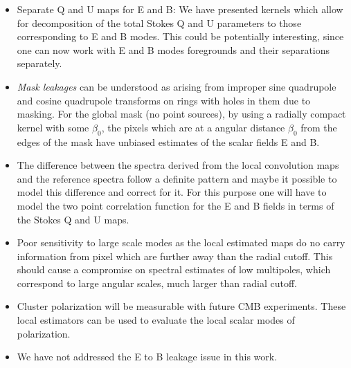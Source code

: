 \begin{itemize}
\item{Separate Q and U maps for E and B:} We have presented kernels which allow for decomposition of the total Stokes Q and U parameters to those corresponding to E and B modes. This could be potentially interesting, since one can now work with E and B modes foregrounds and their separations separately. 

\item \textit{Mask leakages} can be understood as arising from improper sine quadrupole and cosine quadrupole transforms on rings with holes in them due to masking. For the global mask (no point sources), by using a radially compact kernel with some $\beta_0$, the pixels which are at a angular distance $\beta_0$ from the edges of the mask have unbiased estimates of the scalar fields E and B.

\item{The difference between the spectra derived from the local convolution maps and the reference spectra follow a definite pattern and maybe it possible to model this difference and correct for it. For this purpose one will have to model the two point correlation function for the E and B fields in terms of the Stokes Q and U maps.}

\item{Poor sensitivity to large scale modes as the local estimated maps do no carry information from pixel which are further away than the radial cutoff. This should cause a compromise on spectral estimates of low multipoles, which correspond to large angular scales, much larger than radial cutoff.}
\item{Cluster polarization will be measurable with future CMB experiments. These local estimators can be used to evaluate the local scalar modes of polarization.}

\item{We have not addressed the E to B leakage issue in this work.}


\end{itemize}

